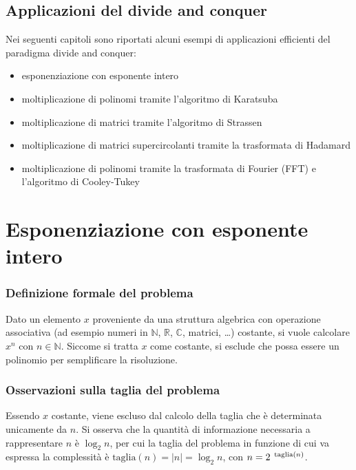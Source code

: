 \subsection{Applicazioni del divide and conquer}
Nei seguenti capitoli sono riportati alcuni esempi di applicazioni efficienti del paradigma divide and conquer:
\begin{itemize}
	\item esponenziazione con esponente intero
	\item moltiplicazione di polinomi tramite l'algoritmo di Karatsuba
	\item moltiplicazione di matrici tramite l'algoritmo di Strassen
	\item moltiplicazione di matrici supercircolanti tramite la trasformata di Hadamard
	\item moltiplicazione di polinomi tramite la trasformata di Fourier (FFT) e l'algoritmo di Cooley-Tukey
\end{itemize}

\newpage

\section{Esponenziazione con esponente intero}
\subsubsection*{Definizione formale del problema}
Dato un elemento \(x\) proveniente da una struttura algebrica con operazione associativa (ad esempio numeri in \(\mathbb{N}\),
\(\mathbb{R}\), \(\mathbb{C}\), matrici, \dots) costante, si vuole calcolare \(x^n\) con \(n \in \mathbb{N}\). Siccome si
tratta \(x\) come costante, si esclude che possa essere un polinomio per semplificare la risoluzione.

\subsubsection*{Osservazioni sulla taglia del problema}
Essendo \(x\) costante, viene escluso dal calcolo della taglia che è determinata unicamente da \(n\). Si osserva che la
quantità di informazione necessaria a rappresentare \(n\) è \(\log_2 n\), per cui la taglia del problema in funzione di
cui va espressa la complessità è \(\text{taglia}(n) = |n| = \log_2 n\), con \(n = 2 ^{\text{\, taglia}(n)}\).

